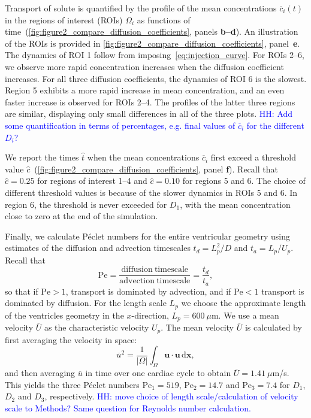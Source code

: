 \documentclass[fleqn]{wlscirep}
\newcommand{\dx}{\, \mathrm d\bm{x}}
\newcommand{\uu}{\mathbf{u}}
\newcommand{\lyng}[1]{\textcolor{blue}{#1}}
\begin{document}
Transport of solute is quantified by the profile of the mean concentrations $\overline{c}_i(t)$ in the regions of interest (ROIs) $\Omega_i$ as functions of time~(\cref{fig:figure2_compare_diffusion_coefficients}, panels \textbf{b--d}).  An illustration of the ROIs is provided in \cref{fig:figure2_compare_diffusion_coefficients}, panel~\textbf{e}. The dynamics of ROI 1 follow from imposing~\cref{eq:injection_curve}. For ROIs 2--6, we observe more rapid concentration increases when the diffusion coefficient increases.  For all three diffusion coefficients, the dynamics of ROI 6 is the slowest. Region 5 exhibits a more rapid increase in mean concentration, and an even faster increase is observed for ROIs 2--4. The profiles of the latter three regions are similar, displaying only small differences in all of the three plots. \lyng{HH: Add some quantification in terms of percentages, e.g. final values of $\overline{c}_i$ for the different $D_i$?}

We report the times $\hat{t}$ when the mean concentrations $\overline{c}_i$ first exceed a threshold value $\hat{c}$~(\cref{fig:figure2_compare_diffusion_coefficients}, panel \textbf{f}). Recall that $\hat{c}=0.25$ for regions of interest 1--4 and $\hat{c}=0.10$ for regions 5 and 6. The choice of different threshold values is because of the slower dynamics in ROIs 5 and 6. In region 6, the threshold is never exceeded for $D_1$, with the mean concentration close to zero at the end of the simulation. 

Finally, we calculate Péclet numbers for the entire ventricular geometry using estimates of the diffusion and advection timescales $t_d=L_p^2/D$ and $t_a=L_p/U_p$. Recall that
\begin{equation*}
    \mathrm{Pe} = \frac{\mathrm{diffusion \ timescale}}{\mathrm{advection \ timescale}} = \frac{t_d}{t_a},
\end{equation*}
so that if $\mathrm{Pe} > 1$, transport is dominated by advection, and if $\mathrm{Pe} < 1$ transport is dominated by diffusion. For the length scale $L_p$ we choose the approximate length of the ventricles geometry in the $x$-direction, $L_p=600 \ \mu$m. We use a mean velocity $\overline{U}$ as the characteristic velocity $U_p$. The mean velocity $\overline{U}$ is calculated by first averaging the velocity in space:
\begin{equation*}
    \overline{u}^2 = \frac{1}{|\Omega|}\int_{\Omega}\uu\cdot\uu\dx,
\end{equation*}
and then averaging $\overline{u}$ in time over one cardiac cycle to obtain $\overline{U}=1.41 \ \mu$m/s. This yields the three Péclet numbers $\mathrm{Pe}_1=519$, $\mathrm{Pe}_2=14.7$ and $\mathrm{Pe}_3=7.4$ for $D_1$, $D_2$ and $D_3$, respectively. \lyng{HH: move choice of length scale/calculation of velocity scale to Methods? Same question for Reynolds number calculation.} 
\end{document}
